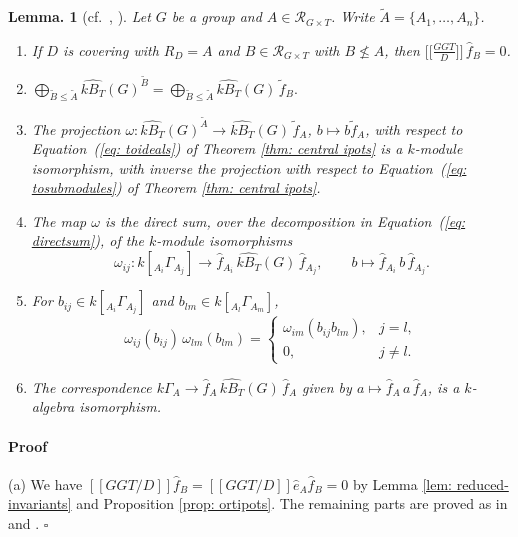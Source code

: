 \documentclass[12pt]{article}
\theoremstyle{change}
\newtheorem{lem}[theorem]{Lemma.}
\newenvironment{proof}{\paragraph{Proof}}{\hfill$\square$}
\renewcommand{\le}{\leqslant} %
\newcommand{\calR}{\mathcal{R}}
\newcommand{\1}{{\bf 1}}
\begin{document}
\begin{lem}[cf.\ {\cite[Lemma 6.6]{BC}}, {\cite[Lemma 4.9]{CM}}]
\label{lem: comparing}
Let $G$ be a group and $A\in\calR_{G\times T}$. Write $\widetilde{A}=\{A_1,\dots,A_n\}$.
\begin{enumerate}
  \item[(a)] If $D$ is covering with $R_D=A$ and $B\in\calR_{G\times T}$ with $B\not\le A$, then $\big[\big[\tfrac{GGT}{D}\big]\big]\,\widehat{f}_B=0$.
  \item[(b)] $\displaystyle\bigoplus_{\widetilde{B}\le\widetilde{A}}\widehat{kB_T}(G)^{\widetilde{B}}
    =\bigoplus_{\widetilde{B}\le \widetilde{A}}\widehat{kB_T}(G)\,\widetilde{f}_B.$
  \item[(c)] The projection $\omega:\widehat{kB_T}(G)^{\widetilde{A}}\to\widehat{kB_T}(G)\,\widetilde{f}_A$, $b\mapsto b\widetilde{f}_A$, with respect to Equation~(\ref{eq: toideals}) of Theorem \ref{thm: central ipots} is a $k$-module isomorphism, with inverse the projection with respect to Equation~(\ref{eq: tosubmodules}) of Theorem \ref{thm: central ipots}.
 \item[(d)] The map $\omega$ is the direct sum, over the decomposition in Equation~(\ref{eq: directsum}), of the $k$-module isomorphisms
\[
\omega_{ij}:k[{}_{A_i}\Gamma_{A_j}]\to\widehat{f}_{A_i}\,\widehat{kB_T}(G)\,\widehat{f}_{A_j}, \qquad b\mapsto\widehat{f}_{A_i}\,b\,\widehat{f}_{A_j}.
\]
  \item[(e)] For $b_{ij}\in k[{}_{A_i}\Gamma_{A_j}]$ and $b_{lm}\in k[{}_{A_l}\Gamma_{A_m}]$,
             \[
               \omega_{ij}(b_{ij})\,\omega_{lm}(b_{lm})=
               \begin{cases}\omega_{im}(b_{ij}b_{lm}),&j=l,\\[2pt]0,&j\neq l.\end{cases}
             \]
  \item[(f)] The correspondence $k\Gamma_A\to\widehat{f}_A\,\widehat{kB_T}(G)\,\widehat{f}_A$ given by  $a\mapsto\widehat{f}_A\,a\,\widehat{f}_A$, is a $k$-algebra isomorphism.
\end{enumerate}
\end{lem}
\begin{proof}
(a) We have $[[GGT/D]]\widehat{f}_B = [[GGT/D]]\widehat{e}_A\widehat{f}_B = 0$ by Lemma \ref{lem: reduced-invariants} and Proposition \ref{prop: ortipots}. The remaining parts are proved as in \cite[Lemma 6.6]{BC} and \cite[Lemma 4.9]{CM}.
\end{proof}
\end{document}
